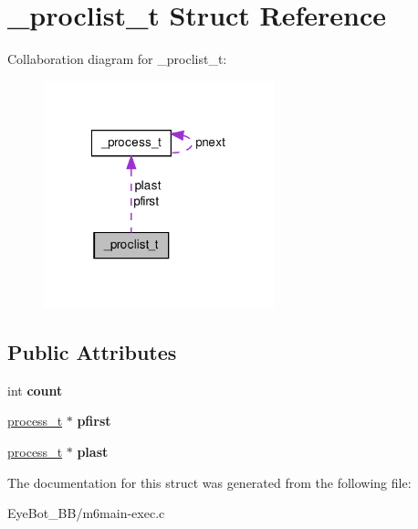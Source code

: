 \hypertarget{struct__proclist__t}{\section{\-\_\-proclist\-\_\-t \-Struct \-Reference}
\label{struct__proclist__t}
}


\-Collaboration diagram for \-\_\-proclist\-\_\-t\-:\nopagebreak
\begin{figure}[H]
\begin{center}
\leavevmode
\includegraphics[width=190pt]{struct__proclist__t__coll__graph}
\end{center}
\end{figure}
\subsection*{\-Public \-Attributes}
\begin{DoxyCompactItemize}
\item 
\hypertarget{struct__proclist__t_abe30805f1de045b96e7a11fbff91bc1a}{int {\bfseries count}}\label{struct__proclist__t_abe30805f1de045b96e7a11fbff91bc1a}

\item 
\hypertarget{struct__proclist__t_a627b67853e9747a3c6cf39e136e6f881}{\hyperlink{struct__process__t}{process\-\_\-t} $\ast$ {\bfseries pfirst}}\label{struct__proclist__t_a627b67853e9747a3c6cf39e136e6f881}

\item 
\hypertarget{struct__proclist__t_acaab800af69b8b070019f6f073733584}{\hyperlink{struct__process__t}{process\-\_\-t} $\ast$ {\bfseries plast}}\label{struct__proclist__t_acaab800af69b8b070019f6f073733584}

\end{DoxyCompactItemize}


\-The documentation for this struct was generated from the following file\-:\begin{DoxyCompactItemize}
\item 
\-Eye\-Bot\-\_\-\-B\-B/m6main-\/exec.\-c\end{DoxyCompactItemize}
